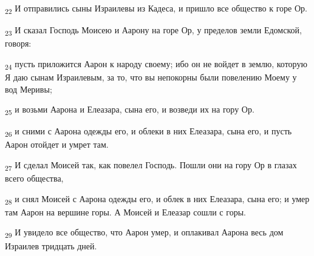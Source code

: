\begin{tcolorbox}
\textsubscript{22} И отправились сыны Израилевы из Кадеса, и пришло все общество к горе Ор.
\end{tcolorbox}
\begin{tcolorbox}
\textsubscript{23} И сказал Господь Моисею и Аарону на горе Ор, у пределов земли Едомской, говоря:
\end{tcolorbox}
\begin{tcolorbox}
\textsubscript{24} пусть приложится Аарон к народу своему; ибо он не войдет в землю, которую Я даю сынам Израилевым, за то, что вы непокорны были повелению Моему у вод Меривы;
\end{tcolorbox}
\begin{tcolorbox}
\textsubscript{25} и возьми Аарона и Елеазара, сына его, и возведи их на гору Ор.
\end{tcolorbox}
\begin{tcolorbox}
\textsubscript{26} и сними с Аарона одежды его, и облеки в них Елеазара, сына его, и пусть Аарон отойдет и умрет там.
\end{tcolorbox}
\begin{tcolorbox}
\textsubscript{27} И сделал Моисей так, как повелел Господь. Пошли они на гору Ор в глазах всего общества,
\end{tcolorbox}
\begin{tcolorbox}
\textsubscript{28} и снял Моисей с Аарона одежды его, и облек в них Елеазара, сына его; и умер там Аарон на вершине горы. А Моисей и Елеазар сошли с горы.
\end{tcolorbox}
\begin{tcolorbox}
\textsubscript{29} И увидело все общество, что Аарон умер, и оплакивал Аарона весь дом Израилев тридцать дней.
\end{tcolorbox}
